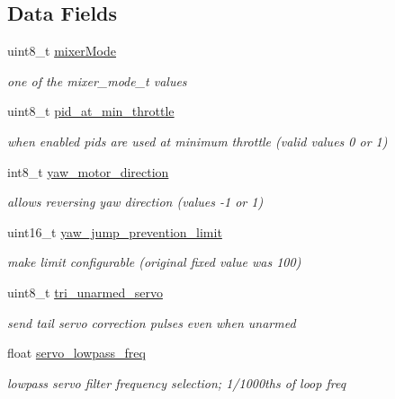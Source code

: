 \subsection*{Data Fields}
\begin{DoxyCompactItemize}
\item 
uint8\+\_\+t \hyperlink{structmixer__config_a3ef00c251c808edf383b1114263202bf}{mixer\+Mode}
\begin{DoxyCompactList}\small\item\em one of the mixer\+\_\+mode\+\_\+t values \end{DoxyCompactList}\item 
uint8\+\_\+t \hyperlink{structmixer__config_ab0bbe459d4fb13edc71ccc4fc92cb7d3}{pid\+\_\+at\+\_\+min\+\_\+throttle}
\begin{DoxyCompactList}\small\item\em when enabled pids are used at minimum throttle (valid values 0 or 1) \end{DoxyCompactList}\item 
int8\+\_\+t \hyperlink{structmixer__config_af5c1a0577e80ef6f5f2820506a906e24}{yaw\+\_\+motor\+\_\+direction}
\begin{DoxyCompactList}\small\item\em allows reversing yaw direction (values -\/1 or 1) \end{DoxyCompactList}\item 
uint16\+\_\+t \hyperlink{structmixer__config_a81d695b85aa12bb0f7b5d806c5fe2bd6}{yaw\+\_\+jump\+\_\+prevention\+\_\+limit}
\begin{DoxyCompactList}\small\item\em make limit configurable (original fixed value was 100) \end{DoxyCompactList}\item 
uint8\+\_\+t \hyperlink{structmixer__config_af445bdb2c8e719752f254c017d8c9817}{tri\+\_\+unarmed\+\_\+servo}
\begin{DoxyCompactList}\small\item\em send tail servo correction pulses even when unarmed \end{DoxyCompactList}\item 
float \hyperlink{structmixer__config_acadf394b2a40a9e17ea114bc3f6bef59}{servo\+\_\+lowpass\+\_\+freq}
\begin{DoxyCompactList}\small\item\em lowpass servo filter frequency selection; 1/1000ths of loop freq \end{DoxyCompactList}\item 

\end{DoxyCompactItemize}
